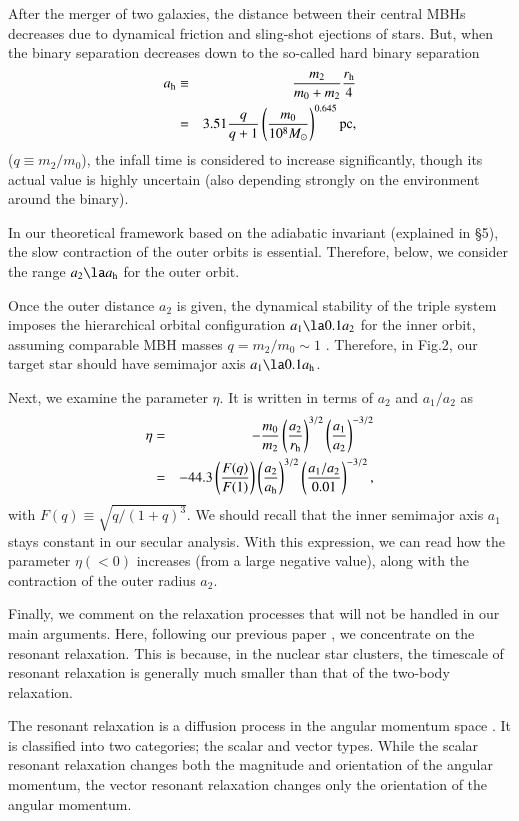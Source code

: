\documentclass[useAMS,usenatbib,twocolumn]{mn2e}
\newcommand{\beqa}{\begin{eqnarray}}
\newcommand{\eeqa}{\end{eqnarray}}
\newcommand{\lsim}{\la}
\newcommand{\lmk}{\left(}
\newcommand{\rmk}{\right)}
\begin{document}
After the merger of two galaxies, the distance between their
central MBHs decreases due to  dynamical friction and
sling-shot ejections of  stars.
But, when the binary separation decreases down to the so-called
hard binary separation
\beqa
a_{\rm h}&\equiv&\frac{m_{2}}{m_0+m_2}\frac{r_{\rm
h}}{4}\nonumber\\
&=&3.51\frac{q}{q+1}\left(\frac{m_0}{10^8M_{\odot}}\right)^{0.645}{\rm
pc},
\eeqa
($q \equiv m_2/m_0$), the infall time is considered to increase
significantly, though its actual value is highly uncertain (also
depending strongly on the environment around the binary).


In our theoretical framework based on the adiabatic invariant 
(explained in \S 5),
the slow contraction of the outer orbits is essential.
Therefore, below, we consider the range $a_{2}\lsim a_{\rm h}$
for the outer orbit.


Once the outer distance $a_2$ is given, the dynamical stability
of the triple system imposes the hierarchical
orbital configuration $a_1\lsim0.1a_2$ for the inner orbit, assuming comparable MBH masses $q=m_2/m_0\sim 1$ \citep{mardling2001}.
Therefore, in Fig.2, our target star should have  semimajor axis $a_1\lsim0.1 a_{\rm h}$. 

Next, we examine the parameter $\eta$. 
It is written in terms of $a_2$ and $a_1/a_2$ as
\beqa
\eta&=&-\frac{m_0}{m_2}\left(\frac{a_2}{r_{\rm
h}}\right)^{3/2}\left(\frac{a_1}{a_2}\right)^{-3/2}\nonumber\\
&=&-44.3 \lmk \frac{F(q)}{F(1)}\rmk
\left(\frac{a_2}{a_{\rm
h}}\right)^{3/2}\left(\frac{a_1/a_2}{0.01}\right)^{-3/2},
\eeqa
with $F(q)\equiv \sqrt{q/(1+q)^3}$.  We should recall that
the inner semimajor axis $a_1$ stays constant in our secular
analysis. With this expression, we can read how the parameter
$\eta(<0)$ increases (from a large negative value), along with
the contraction of the outer radius $a_2$.


Finally, we comment on the relaxation processes that will not be
handled in our main arguments.
 Here,   following our
previous paper \citep{iwasa2016}, we concentrate on
the resonant relaxation.
This is because, in the nuclear star clusters, the timescale of resonant relaxation
  is generally much smaller than that of the
two-body relaxation.



The resonant relaxation is a
diffusion process in the angular momentum space \citep{1996NewA....1..149R,alexander2005,2011MNRAS.412..187K}. It is
classified into two categories; the scalar and vector types. While
the scalar resonant relaxation changes both the magnitude and
orientation of the angular momentum, the vector resonant
relaxation changes only the orientation of the angular momentum.
\end{document}
